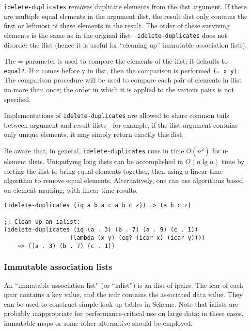 \begin{entry}{%
  }

  \texttt{idelete-duplicates} removes duplicate elements from
  the ilist argument. If there are multiple equal elements in the
  argument ilist, the result ilist only contains the first or leftmost
  of these elements in the result. The order of these surviving
  elements is the same as in the original
  ilist---\texttt{idelete-duplicates} does not disorder the ilist
  (hence it is 
  useful for ``cleaning up'' immutable association lists).

  The = parameter is used to compare the elements of the ilist; it
  defaults to \texttt{equal?}. If x comes before y in ilist, then the
  comparison is performed \texttt{(=\ x\ y)}. The comparison procedure
  will be used to compare each pair of elements in ilist no more than
  once; the order in which it is applied to the various pairs is not
  specified.

  Implementations of \texttt{idelete-duplicates} are allowed to share
  common tails between argument and result ilists---for example, if
  the ilist argument contains only unique elements, it may simply
  return exactly this ilist.

  Be aware that, in general, \texttt{idelete-duplicates} runs in time
  $O(n^2)$ for n-element ilists. Uniquifying long
  ilists can be accomplished in $O(n \lg n)$ time by sorting the ilist to
  bring equal elements together, then using a linear-time algorithm to
  remove equal elements. Alternatively, one can use algorithms based
  on element-marking, with linear-time results.

\begin{verbatim}
(idelete-duplicates (iq a b a c a b c z)) => (a b c z)

;; Clean up an ialist:
(idelete-duplicates (iq (a . 3) (b . 7) (a . 9) (c . 1))
                   (lambda (x y) (eq? (icar x) (icar y))))
    => ((a . 3) (b . 7) (c . 1))
\end{verbatim}
\end{entry}

\subsubsection{{Immutable association lists}}

An ``immutable association list'' (or ``ialist'') is an ilist of ipairs.
The icar of each ipair contains a key value, and the icdr contains the
associated data value. They can be used to construct simple look-up
tables in Scheme. Note that ialists are probably inappropriate for
performance-critical use on large data; in these cases, immutable maps
or some other alternative should be employed.

